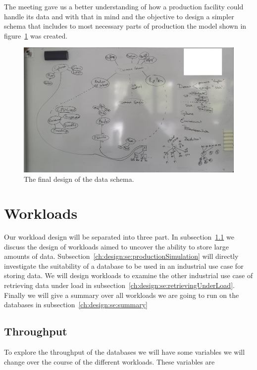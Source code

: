 The meeting gave us a better understanding of how a production facility could handle its data and with that in mind and the objective to design a simpler schema that includes to most necessary parts of production the model shown in figure~\ref{fig:finalDesignOfSchema} was created.

\begin{figure}
  \includegraphics[width=\textwidth]{images/firstDesignOfSchema}
  \caption{The final design of the data schema.}
  \label{fig:finalDesignOfSchema}
\end{figure}


\section{Workloads}
\label{ch:design:se:workloads}
Our workload design will be separated into three part.
In subsection~\ref{ch:design:se:throughput} we discuss the design of workloads aimed to uncover the ability to store large amounts of data.
Subsection~\ref{ch:design:se:productionSimulation} will directly investigate the suitability of a database to be used in an industrial use case for storing data.
We will design workloads to examine the other industrial use case of retrieving data under load in subsection~\ref{ch:design:se:retrievingUnderLoad}.
Finally we will give a summary over all workloads we are going to run on the databases in subsection~\ref{ch:design:se:summary}

\subsection{Throughput}
\label{ch:design:se:throughput}
To explore the throughput of the databases we will have some variables we will change over the course of the different workloads.
These variables are

